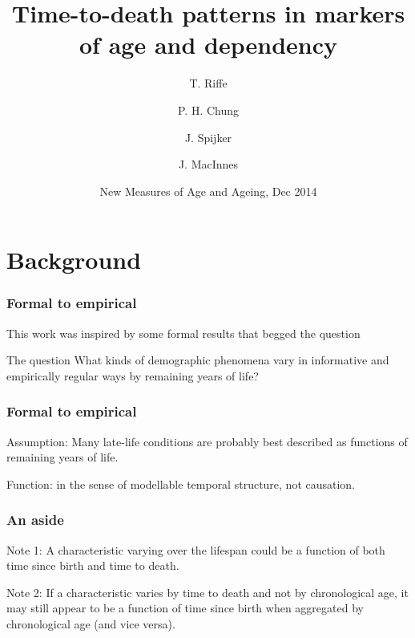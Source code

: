 \documentclass{beamer}
\title[TTD markers]{Time-to-death patterns in markers of age and dependency}
\author[Riffe et. al.]
{
T. Riffe \inst{1} \and P. H. Chung \inst{1} \and J. Spijker \inst{2} \and J.
MacInnes \inst{3} }
\institute[VFU] %
{
  \inst{1}%
  Department of Demography\\
  University of California, Berkeley
  \and
  \inst{2}%
  Wittgenstein Centre (IIASA, VID/\"OAW, WU), Vienna Institute of
  Demography/Austrian Academy of Sciences
  \and
  \inst{3}
  School of Social and Political Science\\
  University of Edinburgh
}
\date[Dec 2014] %
{New Measures of Age and Ageing, Dec 2014}
\begin{document}
\begin{frame}
\titlepage %
\end{frame}

\section{Background} %

\begin{frame}
\frametitle{Formal to empirical}
This work was inspired by some formal results that begged the question
\begin{block}{The question}
What kinds of demographic phenomena vary in informative and empirically regular
ways by remaining years of life?
\end{block}
\end{frame}


\begin{frame}
\frametitle{Formal to empirical}
\begin{block}{Assumption:}
Many late-life conditions are probably best described as
functions of remaining years of life.
\end{block}
\vspace{1em}
\begin{block}{Function:}
in the sense of modellable temporal structure, not causation.
\end{block}
\end{frame}


\begin{frame}
\frametitle{An aside}
\begin{block}{Note 1:}
A characteristic varying over the lifespan could be a function of both time
since birth and time to death.
\end{block}
\begin{block}{Note 2:}
If a characteristic varies by time to death and not by chronological age, it may
still appear to be a function of time since birth when aggregated by chronological
age (and vice versa).
\end{block}
\end{frame}

\end{document}
